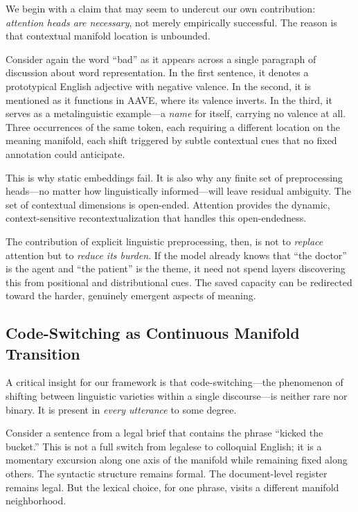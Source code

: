 \documentclass[11pt]{article}
\begin{document}
We begin with a claim that may seem to undercut our own contribution: 
\emph{attention heads are necessary}, not merely empirically successful. The reason 
is that contextual manifold location is unbounded.

Consider again the word ``bad'' as it appears across a single paragraph of 
discussion about word representation. In the first sentence, it denotes a 
prototypical English adjective with negative valence. In the second, it is 
mentioned as it functions in AAVE, where its valence inverts. In the third, it 
serves as a metalinguistic example---a \emph{name} for itself, carrying no valence 
at all. Three occurrences of the same token, each requiring a different location 
on the meaning manifold, each shift triggered by subtle contextual cues that no 
fixed annotation could anticipate.

This is why static embeddings fail. It is also why any finite set of preprocessing 
heads---no matter how linguistically informed---will leave residual ambiguity. 
The set of contextual dimensions is open-ended. Attention provides the dynamic, 
context-sensitive recontextualization that handles this open-endedness.

The contribution of explicit linguistic preprocessing, then, is not to 
\emph{replace} attention but to \emph{reduce its burden}. If the model already 
knows that ``the doctor'' is the agent and ``the patient'' is the theme, it need 
not spend layers discovering this from positional and distributional cues. 
The saved capacity can be redirected toward the harder, genuinely emergent 
aspects of meaning.

\subsection{Code-Switching as Continuous Manifold Transition}
\label{sec:codeswitching}

A critical insight for our framework is that code-switching---the phenomenon of 
shifting between linguistic varieties within a single discourse---is neither rare 
nor binary. It is present in \emph{every utterance} to some degree.

Consider a sentence from a legal brief that contains the phrase ``kicked the 
bucket.'' This is not a full switch from legalese to colloquial English; it is a 
momentary excursion along one axis of the manifold while remaining fixed along 
others. The syntactic structure remains formal. The document-level register 
remains legal. But the lexical choice, for one phrase, visits a different 
manifold neighborhood.
\end{document}
